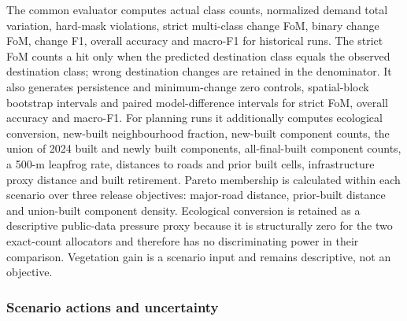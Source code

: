 \documentclass[
]{article}
\begin{document}
The common evaluator computes actual class counts, normalized demand
total variation, hard-mask violations, strict multi-class change FoM,
binary change FoM, change F1, overall accuracy and macro-F1 for
historical runs. The strict FoM counts a hit only when the predicted
destination class equals the observed destination class; wrong
destination changes are retained in the denominator. It also generates
persistence and minimum-change zero controls, spatial-block bootstrap
intervals and paired model-difference intervals for strict FoM, overall
accuracy and macro-F1. For planning runs it additionally computes
ecological conversion, new-built neighbourhood fraction, new-built
component counts, the union of 2024 built and newly built components,
all-final-built component counts, a 500-m leapfrog rate, distances to
roads and prior built cells, infrastructure proxy distance and built
retirement. Pareto membership is calculated within each scenario over
three release objectives: major-road distance, prior-built distance and
union-built component density. Ecological conversion is retained as a
descriptive public-data pressure proxy because it is structurally zero
for the two exact-count allocators and therefore has no discriminating
power in their comparison. Vegetation gain is a scenario input and
remains descriptive, not an objective.

\subsubsection{Scenario actions and
uncertainty}\label{scenario-actions-and-uncertainty}
\end{document}
